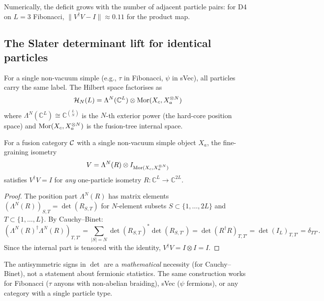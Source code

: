 \begin{remark}
Numerically, the deficit grows with the number of adjacent particle pairs: for D4 on $L=3$ Fibonacci, $\|V^\dagger V - I\| \approx 0.11$ for the product map.
\end{remark}

\subsection{The Slater determinant lift for identical particles}

For a single non-vacuum simple (e.g., $\tau$ in Fibonacci, $\psi$ in sVec), all particles carry the same label. The Hilbert space factorises as
\begin{equation}
\label{eq:factorisation}
    \mathcal{H}_N(L) = \Lambda^N(\mathbb{C}^L) \otimes \operatorname{Mor}(X_c, X_a^{\otimes N})
\end{equation}
where $\Lambda^N(\mathbb{C}^L) \cong \mathbb{C}^{\binom{L}{N}}$ is the $N$-th exterior power (the hard-core position space) and $\operatorname{Mor}(X_c, X_a^{\otimes N})$ is the fusion-tree internal space.

\begin{theorem}
\label{thm:slater}
For a fusion category $\mathcal{C}$ with a single non-vacuum simple object $X_a$, the fine-graining isometry
\begin{equation}
    V = \Lambda^N(R) \otimes I_{\operatorname{Mor}(X_c, X_a^{\otimes N})}
\end{equation}
satisfies $V^\dagger V = I$ for \emph{any} one-particle isometry $R: \mathbb{C}^L \to \mathbb{C}^{2L}$.
\end{theorem}

\begin{proof}
The position part $\Lambda^N(R)$ has matrix elements $(\Lambda^N(R))_{S,T} = \det(R_{S,T})$ for $N$-element subsets $S \subset \{1,\ldots,2L\}$ and $T \subset \{1,\ldots,L\}$. By Cauchy--Binet:
\begin{equation}
    (\Lambda^N(R)^\dagger \Lambda^N(R))_{T,T'} = \sum_{|S|=N} \det(R_{S,T})^* \det(R_{S,T'}) = \det(R^\dagger R)_{T,T'} = \det(I_L)_{T,T'} = \delta_{TT'}.
\end{equation}
Since the internal part is tensored with the identity, $V^\dagger V = I \otimes I = I$.
\end{proof}

\begin{remark}
The antisymmetric signs in $\det$ are a \emph{mathematical} necessity (for Cauchy--Binet), not a statement about fermionic statistics. The same construction works for Fibonacci ($\tau$ anyons with non-abelian braiding), sVec ($\psi$ fermions), or any category with a single particle type.
\end{remark}

